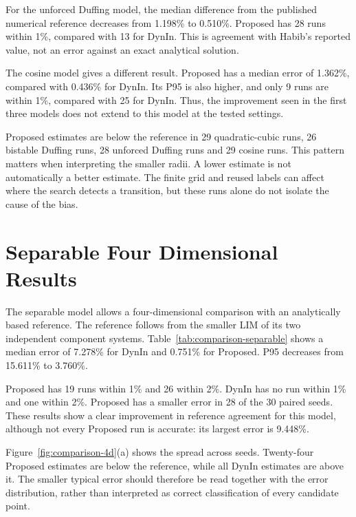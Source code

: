 For the unforced Duffing model, the median difference from the published numerical reference decreases from 1.198\% to 0.510\%. Proposed has 28 runs within 1\%, compared with 13 for DynIn. This is agreement with Habib's reported value, not an error against an exact analytical solution.

The cosine model gives a different result. Proposed has a median error of 1.362\%, compared with 0.436\% for DynIn. Its P95 is also higher, and only 9 runs are within 1\%, compared with 25 for DynIn. Thus, the improvement seen in the first three models does not extend to this model at the tested settings.


Proposed estimates are below the reference in 29 quadratic-cubic runs, 26 bistable Duffing runs, 28 unforced Duffing runs and 29 cosine runs. This pattern matters when interpreting the smaller radii. A lower estimate is not automatically a better estimate. The finite grid and reused labels can affect where the search detects a transition, but these runs alone do not isolate the cause of the bias.

\section{Separable Four Dimensional Results}



The separable model allows a four-dimensional comparison with an analytically based reference. The reference follows from the smaller LIM of its two independent component systems. Table~\ref{tab:comparison-separable} shows a median error of 7.278\% for DynIn and 0.751\% for Proposed. P95 decreases from 15.611\% to 3.760\%.

Proposed has 19 runs within 1\% and 26 within 2\%. DynIn has no run within 1\% and one within 2\%. Proposed has a smaller error in 28 of the 30 paired seeds. These results show a clear improvement in reference agreement for this model, although not every Proposed run is accurate: its largest error is 9.448\%.

Figure~\ref{fig:comparison-4d}(a) shows the spread across seeds. Twenty-four Proposed estimates are below the reference, while all DynIn estimates are above it. The smaller typical error should therefore be read together with the error distribution, rather than interpreted as correct classification of every candidate point.

